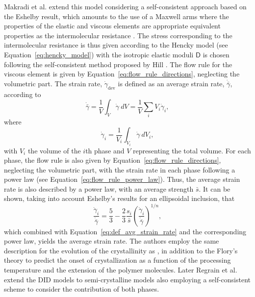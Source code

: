 Makradi et al. \citep{makradiTwophaseSelfconsistentModel2005} extend this model considering a self-consistent approach based on the Eshelby result, which amounts to the use of a Maxwell arms where the properties of the elastic and viscous elements are appropriate equivalent properties as the intermolecular resistance .
The stress corresponding to the intermolecular resistance is thus given according to the Hencky model (see Equation~\eqref{eq:hencky_model}) with the isotropic elastic moduli $\bm{\mathsf D}$ is chosen following the self-consistent method proposed by Hill \citep{hillSelfconsistentMechanicsComposite1965}.
The flow rule for the viscous element is given by Equation~\eqref{eq:flow_rule_directions}, neglecting the volumetric part.
The strain rate, $\dot \gamma_\text{dev}$ is defined as an average strain rate, $\dot{\bar\gamma}$, according to
\begin{equation}
	\label{eq:def_avg_strain_rate}
	\dot{\bar\gamma} = \frac{1}{V}\int_V \dot \gamma\ dV = \frac{1}{V}\sum_i V_i \dot{\gamma}_i,
\end{equation}
where
\begin{equation}
	\dot \gamma_i = \frac{1}{V_i}\int_{V_i} \dot \gamma\ dV_i,
\end{equation}
with $V_i$ the volume of the $i$th phase and $V$ representing the total volume.
For each phase, the flow rule is also given by Equation~\eqref{eq:flow_rule_directions}, neglecting the volumetric part, with the strain rate in each phase following a power law (see Equation~\eqref{eq:flow_rule_power_law}).
Thus, the average strain rate is also described by a power law, with an average strength $\bar s$.
It can be shown, taking into account Eshelby's results for an ellipsoidal inclusion, that
\begin{equation}
	\frac{\dot \gamma_i}{\dot{\bar \gamma}} = \frac{5}{3} - \frac{2}{3}\frac{s_i}{\bar s} \left(\frac{\dot \gamma_i}{\dot{\bar \gamma}}\right)^{1/n},
\end{equation}
which combined with Equation~\eqref{eq:def_avg_strain_rate} and the corresponding power law, yields the average strain rate.
The authors employ the same description for the evolution of the crystallinity as \cite{ahziModelingDeformationBehavior2003}, in addition to the Flory’s theory to predict the onset of crystallization as a function of the processing temperature and the extension of the polymer molecules.
Later Regrain et al. \citep{regrainMultimechanismModelsSemicrystalline2009} extend the DID models to semi-crystalline models also employing a self-consistent scheme to consider the contribution of both phases.

